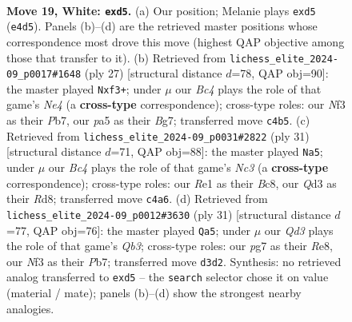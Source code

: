 \documentclass[11pt]{article}
\begin{document}
\begin{figure}[p]
\label{fig:thought-m34}
\end{figure}

\clearpage

\begin{figure}[p]\centering
\begin{subfigure}{0.46\textwidth}\centering
\resizebox{\linewidth}{!}{%
\newchessgame
\chessboard[
  setfen={rr1q2k1/p2b1ppp/2p2n2/p2p4/2B1P2P/1P1Q1NP1/P4P2/R3R1K1 w - - 0 19},
  showmover=false,
  pgfstyle=straightmove, color=movearrow, markmove={e4-d5}
]}
\caption{}
\end{subfigure}\hfill
\begin{subfigure}{0.46\textwidth}\centering
\resizebox{\linewidth}{!}{%
\newchessgame
\chessboard[
  setfen={r4rk1/pp1q1pbp/4p1p1/2BPn3/4P3/2P2N2/P4PPP/1R1Q1RK1 b - - 0 14},
  showmover=false,
  pgfstyle=straightmove, color=movearrow, markmove={e5-f3}
]}
\caption{}
\end{subfigure}
\\[4pt]
\begin{subfigure}{0.46\textwidth}\centering
\resizebox{\linewidth}{!}{%
\newchessgame
\chessboard[
  setfen={r1br2k1/pp2qpp1/2n1p2p/3P4/2B5/1QN4P/PP3PP1/2RR2K1 b - - 0 16},
  showmover=false,
  pgfstyle=straightmove, color=movearrow, markmove={c6-a5}
]}
\caption{}
\end{subfigure}\hfill
\begin{subfigure}{0.46\textwidth}\centering
\resizebox{\linewidth}{!}{%
\newchessgame
\chessboard[
  setfen={r3r3/pp3pp1/1qnbbk1p/3p4/3P1N2/2N2P2/PP1Q1KPP/3R1B1R b - - 1 16},
  showmover=false,
  pgfstyle=straightmove, color=movearrow, markmove={b6-a5}
]}
\caption{}
\end{subfigure}
\caption{\textbf{Move 19, White: \texttt{exd5}.} (a) Our position; Melanie plays \texttt{exd5} (\texttt{e4d5}). Panels (b)--(d) are the retrieved master positions whose correspondence most drove this move (highest QAP objective among those that transfer to it). (b) Retrieved from \texttt{lichess\_elite\_2024-09\_p0017\#1648} (ply 27) [structural distance $d$=78, QAP obj=90]: the master played \texttt{Nxf3+}; under $\mu$ our \emph{Bc4} plays the role of that game's \emph{Ne4} (a \textbf{cross-type} correspondence); cross-type roles: our \emph{N}f3 as their \emph{P}b7, our \emph{p}a5 as their \emph{B}g7; transferred move \texttt{c4b5}. (c) Retrieved from \texttt{lichess\_elite\_2024-09\_p0031\#2822} (ply 31) [structural distance $d$=71, QAP obj=88]: the master played \texttt{Na5}; under $\mu$ our \emph{Bc4} plays the role of that game's \emph{Nc3} (a \textbf{cross-type} correspondence); cross-type roles: our \emph{R}e1 as their \emph{B}c8, our \emph{Q}d3 as their \emph{R}d8; transferred move \texttt{c4a6}. (d) Retrieved from \texttt{lichess\_elite\_2024-09\_p0012\#3630} (ply 31) [structural distance $d$=77, QAP obj=76]: the master played \texttt{Qa5}; under $\mu$ our \emph{Qd3} plays the role of that game's \emph{Qb3}; cross-type roles: our \emph{p}g7 as their \emph{R}e8, our \emph{N}f3 as their \emph{P}b7; transferred move \texttt{d3d2}. Synthesis: no retrieved analog transferred to \texttt{exd5} -- the \texttt{search} selector chose it on value (material / mate); panels (b)--(d) show the strongest nearby analogies.}

\end{figure}
\end{document}
